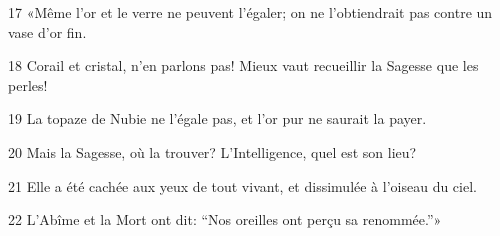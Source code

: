
17 «Même l’or et le verre ne peuvent l’égaler; on ne l’obtiendrait pas contre un vase d’or fin.

18 Corail et cristal, n’en parlons pas! Mieux vaut recueillir la Sagesse que les perles!

19 La topaze de Nubie ne l’égale pas, et l’or pur ne saurait la payer.

20 Mais la Sagesse, où la trouver? L’Intelligence, quel est son lieu?

21 Elle a été cachée aux yeux de tout vivant, et dissimulée à l’oiseau du ciel.

22 L’Abîme et la Mort ont dit: “Nos oreilles ont perçu sa renommée.”»
